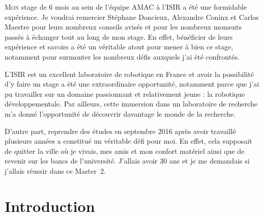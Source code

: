 \documentclass[draft]{llncs}
\begin{document}
\lettrine{M}{on} stage de 6 mois au sein de l'équipe AMAC à l'ISIR a été une formidable expérience.
Je voudrai remercier Stéphane Doncieux, Alexandre Coninx et Carlos Maestre pour leurs nombreux conseils avisés et pour les nombreux moments passés à échanger tout au long de mon stage.
En effet, bénéficier de leurs expérience et savoirs a été un véritable atout pour mener à bien ce stage, notamment pour surmonter les nombreux défis auxquels j'ai été confrontés.

L'ISIR est un excellent laboratoire de robotique en France et avoir la possibilité d'y faire un stage a été une extraordinaire opportunité, notamment parce que j'ai pu travailler sur un domaine passionnant et relativement jeune : la robotique développementale.
Par ailleurs, cette immersion dans un laboratoire de recherche m'a donné l'opportunité de découvrir davantage le monde de la recherche.

D'autre part, reprendre des études en septembre 2016 après avoir travaillé plusieurs années a constitué un véritable défi pour moi.
En effet, cela supposait de quitter la ville où je vivais, mes amis et mon confort matériel ainsi que de revenir sur les bancs de l'université.
J'allais avoir 30 ans et je me demandais si j'allais réussir dans ce Master~2.


\newpage
\section{Introduction}





\end{document}
